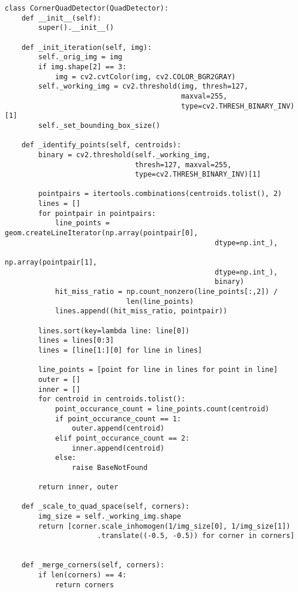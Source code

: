 \begin{verbatim}
class CornerQuadDetector(QuadDetector):
    def __init__(self):
        super().__init__()
    
    def _init_iteration(self, img):
        self._orig_img = img
        if img.shape[2] == 3:
            img = cv2.cvtColor(img, cv2.COLOR_BGR2GRAY)
        self._working_img = cv2.threshold(img, thresh=127,
                                          maxval=255,
                                          type=cv2.THRESH_BINARY_INV)[1]
        self._set_bounding_box_size()
    
    def _identify_points(self, centroids):
        binary = cv2.threshold(self._working_img,
                               thresh=127, maxval=255, 
                               type=cv2.THRESH_BINARY_INV)[1]
        
        pointpairs = itertools.combinations(centroids.tolist(), 2)
        lines = []
        for pointpair in pointpairs:
            line_points = geom.createLineIterator(np.array(pointpair[0],
                                                  dtype=np.int_),
                                                  np.array(pointpair[1], 
                                                  dtype=np.int_),
                                                  binary)
            hit_miss_ratio = np.count_nonzero(line_points[:,2]) / 
                             len(line_points)
            lines.append((hit_miss_ratio, pointpair))
        
        lines.sort(key=lambda line: line[0])
        lines = lines[0:3]
        lines = [line[1:][0] for line in lines]
        
        line_points = [point for line in lines for point in line]
        outer = []
        inner = []
        for centroid in centroids.tolist():
            point_occurance_count = line_points.count(centroid)
            if point_occurance_count == 1:
                outer.append(centroid)
            elif point_occurance_count == 2:
                inner.append(centroid)
            else:
                raise BaseNotFound
        
        return inner, outer
    
    def _scale_to_quad_space(self, corners):
        img_size = self._working_img.shape
        return [corner.scale_inhomogen(1/img_size[0], 1/img_size[1])
                      .translate((-0.5, -0.5)) for corner in corners]
    
    
    def _merge_corners(self, corners):
        if len(corners) == 4:
            return corners
        

\end{verbatim}
